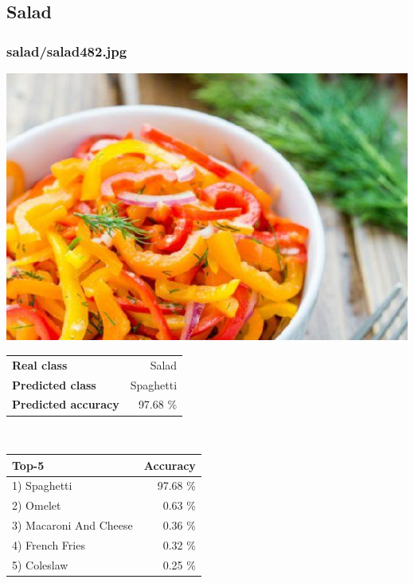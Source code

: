 \subsection{Salad}
    
\subsubsection{salad/salad482.jpg}

\begin{minipage}[t]{0.4\textwidth}
	\vspace{0pt}
	\includegraphics[width=\linewidth]{images/evaluation-images/salad/salad482.jpg}
\end{minipage}
\hfill
\begin{minipage}[t]{0.5\textwidth}
	\vspace{0pt}\raggedright
	\begin{tabularx}{\textwidth}{X r}
		\small \textbf{Real class} & \small Salad\\
		\small \textbf{Predicted class} & \small Spaghetti\\
		\small \textbf{Predicted accuracy} & \small 97.68 \%
    \end{tabularx}\\
    
    \vspace{6pt}
	\begin{tabularx}{\textwidth}{X r}
        \small \textbf{Top-5} & \small \textbf{Accuracy} \\
        \hline
		\small 1) Spaghetti & \small 97.68 \%\\\small 2) Omelet & \small 0.63 \%\\\small 3) Macaroni And Cheese & \small 0.36 \%\\\small 4) French Fries & \small 0.32 \%\\\small 5) Coleslaw & \small 0.25 \%
    \end{tabularx}
\end{minipage}
    
